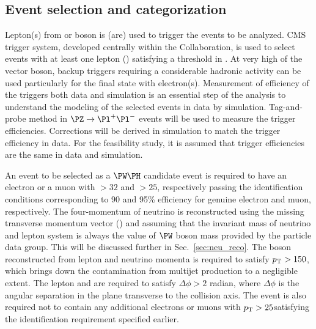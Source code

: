 \documentclass[a4paper,11pt]{article}
\newcommand{\Pb}{{{\Pqb}}\xspace}
\newcommand{\PAb}{{{{\Paqb}}}\xspace}
\begin{document}

\subsection{Event selection and categorization}

Lepton(s) from \PW or \PZ boson is (are) used to trigger the events to be analyzed. 
CMS trigger system, developed centrally within the Collaboration, is used to select events with at least one lepton (\Pl) satisfying a threshold in {\pt}.
At very high \pt of the vector boson, backup triggers requiring a considerable hadronic activity can be used particularly for the final state with electron(s). 
Measurement of efficiency of the triggers both data and simulation is an essential step of the analysis to understand the modeling of the selected events in data by simulation.
Tag-and-probe method in $\PZ \to {\Pl}^{+} {\Pl}^{-}$ events will be used to measure the trigger efficiencies. Corrections will be derived in simulation to match the trigger efficiency in data.
For the feasibility study, it is assumed that trigger efficiencies are the same in data and simulation.

An event to be selected as a $\PW\PH$ candidate event is required to have an electron or a muon with \pt$>32$ and $>25$\GeV, respectively passing the identification conditions corresponding to 90 and 95\% efficiency for genuine electron and muon, respectively. 
The four-momentum of neutrino is reconstructed using the missing transverse momentum vector (\ptvecmiss) and assuming that the invariant mass of neutrino and lepton system is always the value of $\PW$ boson mass provided by the particle data group. 
This will be discussed further in Sec.~\ref{sec:neu_reco}. 
The \PW boson reconstructed from lepton and neutrino momenta is required to satisfy $p_{\mathrm{T}} > 150$\GeV, which brings down the contamination from multijet production to a negligible extent.
The lepton and \ptvecmiss are required to satisfy $\Delta \phi > 2$ radian, where $\Delta \phi$ is the angular separation in the plane transverse to the collision axis.
The event is also required not to contain any additional electrons or muons with $p_{\mathrm{T}}>25$\GeV satisfying the identification requirement specified earlier.
\end{document}
